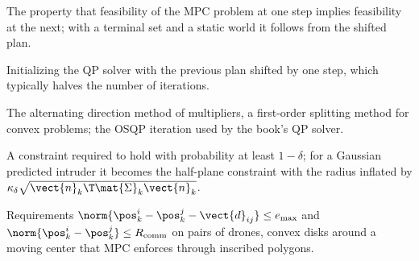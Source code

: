 \item[Recursive feasibility] The property that feasibility of the MPC problem at one step implies feasibility at the next; with a terminal set and a static world it follows from the shifted plan.
\item[Warm start] Initializing the QP solver with the previous plan shifted by one step, which typically halves the number of iterations.
\item[ADMM] The alternating direction method of multipliers, a first-order splitting method for convex problems; the OSQP iteration used by the book's QP solver.
\item[Chance constraint] A constraint required to hold with probability at least $1-\delta$; for a Gaussian predicted intruder it becomes the half-plane constraint with the radius inflated by $\kappa_\delta\sqrt{\vect{n}_k\T\mat{\Sigma}_k\vect{n}_k}$.
\item[Formation and communication-range constraints] Requirements $\norm{\pos^i_k-\pos^j_k-\vect{d}_{ij}}\le e_{\max}$ and $\norm{\pos^i_k-\pos^j_k}\le R_{\mathrm{comm}}$ on pairs of drones, convex disks around a moving center that MPC enforces through inscribed polygons.

